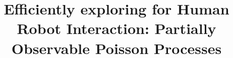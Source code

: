 \documentclass[twoside,11pt]{article}
\begin{document}
	
\newcommand{\tp}{\textrm{\textit{tp}}}
\newcommand{\fp}{\textrm{\textit{fp}}}
\newcommand{\tpr}{\textrm{\textit{tpr}}}
\newcommand{\fnr}{\textrm{\textit{fnr}}}
\newcommand{\fpr}{\textrm{\textit{fpr}}}
\newcommand{\tnr}{\textrm{\textit{tnr}}}
\newtheorem{definition2}[subsection]{Definition}	

\title{Efficiently exploring for Human Robot Interaction: Partially Observable Poisson Processes}

\author{%
   }


\maketitle








% 







%

\vskip 0.2in




\end{document}
